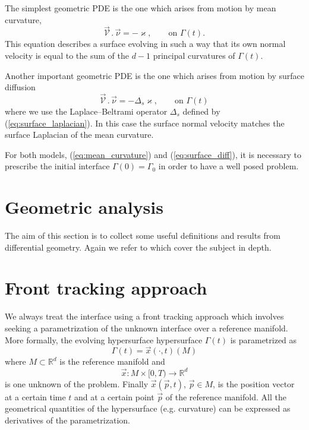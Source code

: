The simplest geometric PDE is the one which arises from motion by mean
curvature,
\begin{equation}\label{eq:mean_curvature}
\vec{\mathcal{V}}\,.\,\vec\nu=-\varkappa,\qquad\mbox{on }\Gamma(t).
\end{equation}
This equation describes a surface evolving in such a way that its own normal
velocity is equal to the sum of the $d-1$ principal curvatures of $\Gamma(t)$.

Another important geometric PDE is the one which arises from motion by
surface diffusion
\begin{equation}\label{eq:surface_diff}
\vec{\mathcal{V}}\,.\,\vec\nu=-\Delta_s \varkappa, \qquad\mbox{on }\Gamma(t)
\end{equation}
where we use the Laplace--Beltrami operator $\Delta_s$ defined by
(\ref{eq:surface_laplacian}). In this case the surface normal velocity matches
the surface Laplacian of the mean curvature.

For both models, (\ref{eq:mean_curvature}) and (\ref{eq:surface_diff}), it is
necessary to prescribe the initial interface $\Gamma(0)=\Gamma_0$ in order to
have a well posed problem.

\section[Geometric Analysis]{Geometric analysis}
The aim of this section is to collect some useful definitions and results from
differential geometry. Again we refer to \cite{DeckelnickDE05} which cover the
subject in depth.

\section[Front tracking approach]{Front tracking approach}
We always treat the interface using a front tracking approach which involves
seeking a parametrization of the unknown interface over a reference manifold.
More formally, the evolving hypersurface hypersurface $\Gamma(t)$ is
parametrized as
\begin{equation}\label{eq:parametric_hypersurface}
 \Gamma(t)=\vec{x}(\cdot,t)(M)
\end{equation}
where $M\subset\mathbb{R}^{d}$ is the reference manifold and
\begin{equation}\label{eq:position_vector}
 \vec{x}:M\times[0,T)\rightarrow\mathbb{R}^{d}
\end{equation}
is one unknown of the problem. Finally $\vec{x}(\vec{p},t)$, $\vec{p}\in M$, is
the position vector at a certain time $t$ and at a certain point $\vec{p}$ of
the reference manifold. All the geometrical quantities of the hypersurface (e.g.
curvature) can be expressed as derivatives of the parametrization.

